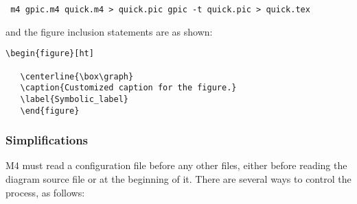   {\tt
  m4 gpic.m4 quick.m4 > quick.pic
    \brtt
  gpic -t quick.pic > quick.tex
   \vspace*\parsep}

\noindent
and the figure inclusion statements are as shown:
\begin{verbatim}
\begin{figure}[ht]
   
   \centerline{\box\graph}
   \caption{Customized caption for the figure.}
   \label{Symbolic_label}
   \end{figure}
\end{verbatim}

\subsubsection{Simplifications\label{Simplifications:}}
M4 must read a configuration file before any other files,
either before reading the diagram source file or at the beginning of it.
There are several ways to control the process, as follows:
